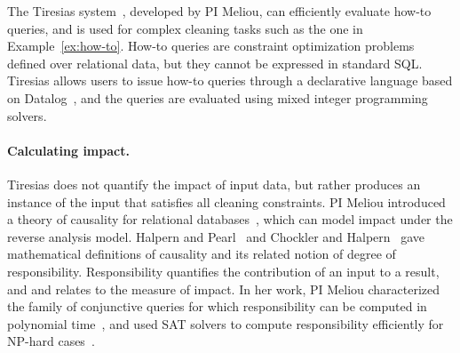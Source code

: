 
The Tiresias system~\cite{DBLP:conf/sigmod/MeliouS12, DBLP:conf/sigmod/MeliouSS12}, developed by PI Meliou, can efficiently evaluate how-to queries, and is used for complex cleaning tasks such as the one in Example~\ref{ex:how-to}. How-to queries are constraint optimization problems defined over relational data, but they cannot be expressed in standard SQL. Tiresias allows users to issue how-to queries through a declarative language based on Datalog~\cite{DBLP:journals/tkde/CeriGT89}, and the queries are evaluated using mixed integer programming solvers. 

\paragraph{Calculating impact.} %
\label{par:calculating_impact}
Tiresias does not quantify the impact of input data, but rather produces an instance of the input that satisfies all cleaning constraints. PI Meliou introduced a theory of causality for relational databases~\cite{DBLP:journals/debu/MeliouGHKMS10}, which can model impact under the reverse analysis model. Halpern and Pearl~\cite{HalpernPearl:Cause2005} and Chockler and Halpern~\cite{DBLP:journals/jair/ChocklerH04} gave mathematical definitions of causality and its related notion of degree of responsibility. Responsibility quantifies the contribution of an input to a result, and and relates to the measure of impact. In her work, PI Meliou characterized the family of conjunctive queries for which responsibility can be computed in polynomial time~\cite{DBLP:journals/pvldb/MeliouGMS11}, and used SAT solvers to compute responsibility efficiently for NP-hard cases~\cite{DBLP:conf/sigmod/MeliouGNS11}.




